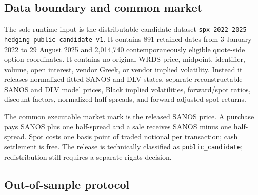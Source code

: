 \documentclass[10pt]{article}
\begin{document}
\subsection{Data boundary and common market}

The sole runtime input is the distributable-candidate dataset
\texttt{spx-2022-2025-hedging-public-candidate-v1}. It contains 891 retained
dates from 3 January 2022 to 29 August 2025 and 2,014,740 contemporaneously
eligible quote-side option coordinates. It contains no original WRDS price,
midpoint, identifier, volume, open interest, vendor Greek, or vendor implied
volatility. Instead it releases normalized fitted SANOS and DLV states,
separate reconstructable SANOS and DLV model prices, Black implied
volatilities, forward/spot ratios, discount factors, normalized half-spreads,
and forward-adjusted spot returns.

The common executable market mark is the released SANOS price. A purchase pays
SANOS plus one half-spread and a sale receives SANOS minus one half-spread.
Spot costs one basis point of traded notional per transaction; cash settlement
is free. The release is technically classified as \texttt{public\_candidate};
redistribution still requires a separate rights decision.

\subsection{Out-of-sample protocol}
\end{document}
